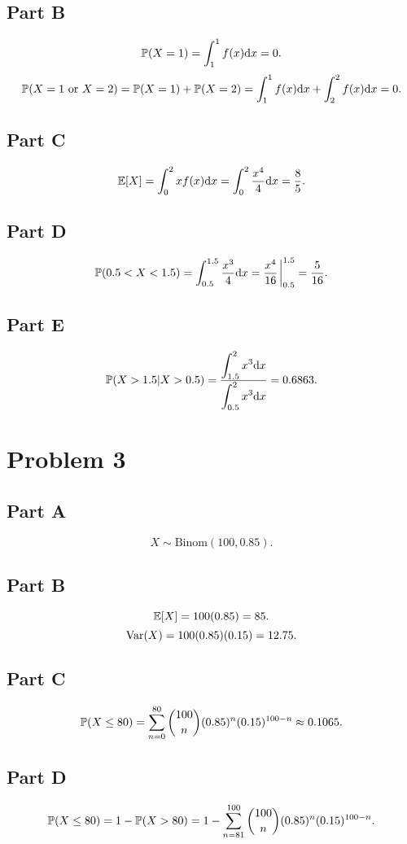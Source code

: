 \documentclass[12pt]{extarticle}
\begin{document}
\subsection*{Part B}
\[
	\mathbb{P}\qty(X = 1) = \int_1^1 f(x) \dd x = 0
.\]
\[
	\mathbb{P}\qty(X = 1 \text{ or } X = 2) = \mathbb{P}\qty(X = 1) + \mathbb{P}\qty(X = 2) = \int_1^1 f(x) \dd x + \int_2^2 f(x) \dd x = 0
.\]

\subsection*{Part C}
\[
	\mathbb{E}\qty[X] = \int_0^2 x f(x) \dd x = \int_0^2 \frac{x^4}{4} \dd x = \frac{8}{5}
.\]

\subsection*{Part D}
\[
	\Prob{0.5 < X < 1.5} = \int_{0.5}^{1.5} \frac{x^3}{4} \dd x = \frac{x^4}{16} \eval_{0.5}^{1.5} = \frac{5}{16}
.\]

\subsection*{Part E}
\[
	\mathbb{P}\qty(X > 1.5 | X > 0.5) = \frac{\displaystyle\int_{1.5}^2 x^3 \dd x}{\displaystyle\int_{0.5}^2 x^3 \dd x} = 0.6863
.\]

\section*{Problem 3}
\subsection*{Part A}
\[
	X \sim \text{Binom}(100, 0.85)
.\]

\subsection*{Part B}
\[
	\mathbb{E}\qty[X] = 100(0.85) = 85
.\]
\[
	\text{Var}\qty(X) = 100(0.85)(0.15) = 12.75
.\]

\subsection*{Part C}
\[
	\mathbb{P}\qty(X \leq 80) = \sum_{n=0}^{80} \binom{100}{n} (0.85)^n (0.15)^{100-n} \approx 0.1065
.\]

\subsection*{Part D}
\[
	\mathbb{P}\qty(X \leq 80) = 1 - \mathbb{P}\qty(X > 80) = 1 - \sum_{n=81}^{100} \binom{100}{n} (0.85)^n (0.15)^{100-n}
.\]
\end{document}
